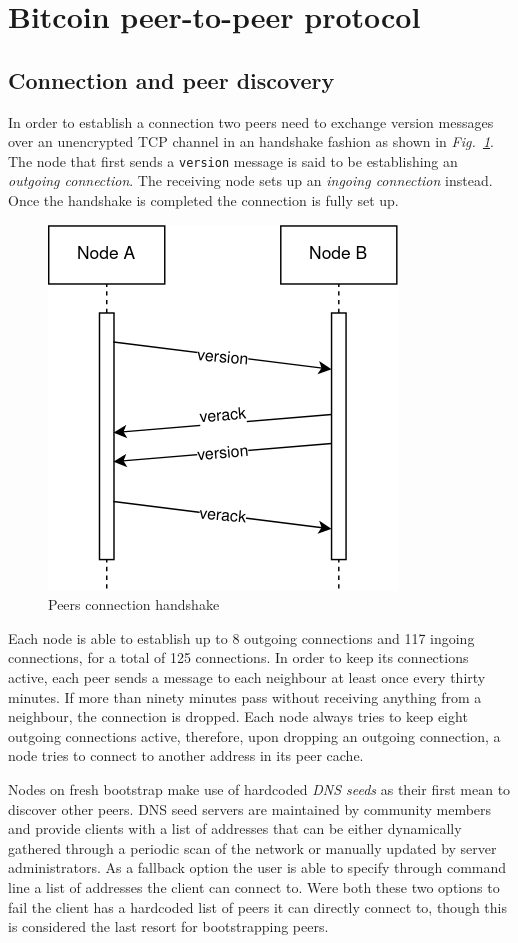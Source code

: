 \documentclass[12pt, letterpaper, twoside]{article}
\title{}
\author{}
\begin{document}
\maketitle

\section{Bitcoin peer-to-peer protocol}\label{sec:netintro}
\subsection{Connection and peer discovery}\label{sec:peerdisc}
In order to establish a connection two peers need to exchange version messages over an unencrypted TCP channel in an handshake fashion as shown in \emph{Fig.~\ref{fig:btcconn}}. The node that first sends a \texttt{version} message is said to be establishing an \emph{outgoing connection}. The receiving node sets up an \emph{ingoing connection} instead. Once the handshake is completed the connection is fully set up.

\begin{figure}[h]
	\includegraphics[width=.45\textwidth]{pict/BTCconnection.png}
	\centering
	\caption{Peers connection handshake}
	\label{fig:btcconn}
\end{figure}

Each node is able to establish up to 8 outgoing connections and 117 ingoing connections, for a total of 125 connections. In order to keep its connections active, each peer sends a message to each neighbour at least once every thirty minutes. If more than ninety minutes pass without receiving anything from a neighbour, the connection is dropped. Each node always tries to keep eight outgoing connections active, therefore, upon dropping an outgoing connection, a node tries to connect to another address in its peer cache.

Nodes on fresh bootstrap make use of hardcoded \emph{DNS seeds} as their first mean to discover other peers. DNS seed servers are maintained by community members and provide clients with a list of addresses that can be either dynamically gathered through a periodic scan of the network or manually updated by server administrators. As a fallback option the user is able to specify through command line a list of addresses the client can connect to. Were both these two options to fail the client has a hardcoded list of peers it can directly connect to, though this is considered the last resort for bootstrapping peers.
\end{document}
